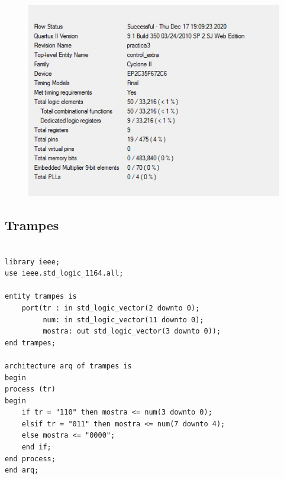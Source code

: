 \documentclass[12pt, a4papre]{article}
\begin{document}
				\begin{figure}[H]
			
				\begin{center}
		\includegraphics[width=130mm]{informeControlExtra.jpeg}
		\end{center}
	\end{figure}	
			
\subsection{Trampes}
	\begin{lstlisting}[style=vhdl, frame=single, basicstyle=\tiny]

library ieee;
use ieee.std_logic_1164.all;

entity trampes is
	port(tr : in std_logic_vector(2 downto 0);
		 num: in std_logic_vector(11 downto 0);
		 mostra: out std_logic_vector(3 downto 0));
end trampes;

architecture arq of trampes is
begin
process (tr)
begin
	if tr = "110" then mostra <= num(3 downto 0);
	elsif tr = "011" then mostra <= num(7 downto 4);
	else mostra <= "0000";
	end if;
end process;
end arq;



			\end{lstlisting}
			
\end{document}
